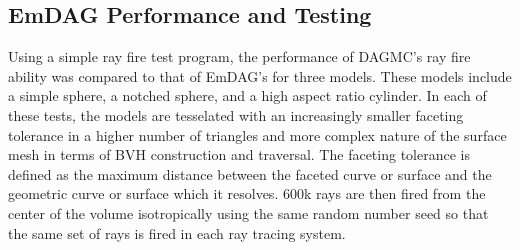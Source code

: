 \documentclass[10pt, a4paper]{article}
\begin{document}
\subsection{EmDAG Performance and Testing}%

Using a simple ray fire test program, the performance of DAGMC's ray fire ability was compared to that of EmDAG's for three models. These models include a simple sphere, a notched sphere, and a high aspect ratio cylinder. In each of these tests, the models are tesselated with an increasingly smaller faceting tolerance in a higher number of triangles and more complex nature of the surface mesh in terms of BVH construction and traversal. The faceting tolerance is defined as the maximum distance between the faceted curve or surface and the geometric curve or surface which it resolves. 600k rays are then fired from the center of the volume isotropically using the same random number seed so that the same set of rays is fired in each ray tracing system.
\end{document}
